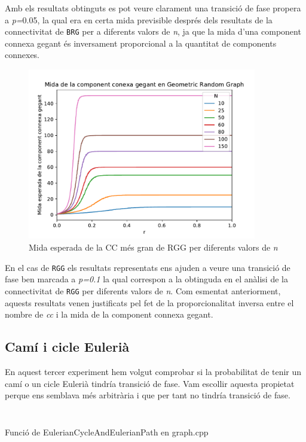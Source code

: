 Amb els resultats obtinguts es pot veure clarament una transició de fase propera a \textit{p=}0.05, la qual era en certa mida previsible després dels resultats de la connectivitat de \texttt{BRG} per a diferents valors de \textit{n}, ja que la mida d'una component connexa gegant és inversament proporcional a la quantitat de components connexes. %

\begin{figure}[H]
    \centering
    \includegraphics[width=10cm]{plots/GRG_midaCompConMax.pdf}
    \caption{Mida esperada de la CC més gran de RGG per diferents valors de \textit{n}}
    \label{fig:connect_04}
\end{figure}

En el cas de \texttt{RGG} els resultats representats ens ajuden a veure una transició de fase ben marcada a \textit{p=0.1} la qual correspon a la obtinguda en el anàlisi de la connectivitat de \texttt{RGG} per diferents valors de \textit{n}. Com esmentat anteriorment, aquests resultats venen justificats pel fet de la proporcionalitat inversa entre el nombre de \textit{cc} i la mida de la component connexa gegant. %

\subsection{Camí i cicle Eulerià}
En aquest tercer experiment hem volgut comprobar si la probabilitat de tenir un camí o un cicle Eulerià tindría transició de fase. Vam escollir aquesta propietat perque ens semblava més arbitrària i que per tant no tindría transició de fase.

\begin{listing}
\inputminted[firstline=8,lastline=8]{cpp}{src/graph.h}
\inputminted[firstline=60,lastline=81]{cpp}{src/graph.cpp}
\caption{Funció de EulerianCycleAndEulerianPath en graph.cpp}
\end{listing}

